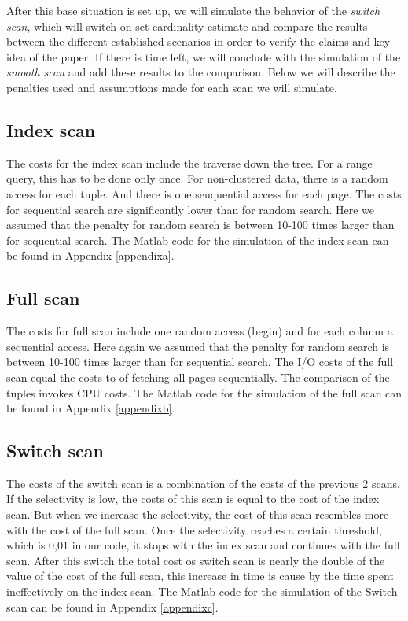 \documentclass[a4paper,11pt,twoside]{article}
\begin{document}
After this base situation is set up, we will simulate the behavior of the \emph{switch scan}, which will switch on set cardinality estimate and compare the results between the different established scenarios in order to verify the claims and key idea of the paper. If there is time left, we will conclude with the simulation of the \emph{smooth scan} and add these results to the comparison. Below we will describe the penalties used and assumptions made for each scan we will simulate.

\subsection{Index scan}
The costs for the index scan include the traverse down the tree. For a range query, this has to be done only once. For non-clustered data, there is a random access for each tuple. And there is one seuquential access for each page. The costs for sequential search are significantly lower than for random search. Here we assumed that the penalty for random search is between 10-100 times larger than for sequential search. The Matlab code for the simulation of the index scan can be found in Appendix \ref{appendixa}.
\subsection{Full scan}
The costs for full scan include one random access (begin) and for each column a sequential access. Here again we assumed that the penalty for random search is between 10-100 times larger than for sequential search. The I/O costs of the full scan equal the costs to of fetching all pages sequentially. The comparison of the tuples invokes CPU costs. The Matlab code for the simulation of the full scan can be found in Appendix \ref{appendixb}.
\subsection{Switch scan}
The costs of the switch scan is a combination of the costs of the previous 2 scans. If the selectivity is low, the costs of this scan is equal to the cost of the index scan. But when we increase the selectivity, the cost of this scan resembles more with the cost of the full scan. Once the selectivity reaches a certain threshold, which is 0,01 in our code, it stops with the index scan and continues  with the full scan. After this switch the total cost os switch scan is nearly the double of the value of the cost of the full scan, this increase in time is cause by the time spent ineffectively on the index scan. The Matlab code for the simulation of the Switch scan can be found in Appendix \ref{appendixc}.
\end{document}
